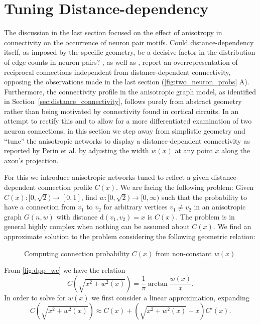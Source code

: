 \newpage
\section{Tuning Distance-dependency}\label{sec:tuned_networks}

The discussion in the last section focused on the effect of anisotropy
in connectivity on the occurrence of neuron pair motifs. Could
distance-dependency itself, as imposed by the specific geometry, be a
decisive factor in the distribution of edge counts in neuron pairs?
\textcite{Song2005}, as well as \textcite{Perin2011}, report an
overrepresentation of reciprocal connections independent from
distance-dependent connectivity, opposing the observations made in the
last section (\autoref{fig:two_neuron_probs} A). Furthermore, the
connectivity profile in the anisotropic graph model, as identified in
Section~\ref{sec:distance_connectivity}, follows purely from abstract
geometry rather than being motivated by connectivity found in cortical
circuits. In an attempt to rectify this and to allow for a more
differentiated examination of two neuron connections, in this section
we step away from simplistic geometry and \enquote{tune} the
anisotropic networks to display a distance-dependent connectivity as
reported by Perin et al. by adjusting the width $w(x)$ at any point
$x$ along the axon's projection.

For this we introduce anisotropic networks tuned to reflect a given
distance-dependent connection profile $C(x)$. We are facing the
following problem: Given $C(x):[0,\sqrt{2}) \to [0,1]$, find
$w:[0,\sqrt{2}) \to [0,\infty)$ such that the probability to have a
connection from $v_1$ to $v_2$ for arbitrary vertices $v_1 \neq v_2$
in an anisotropic graph $G(n,w)$ with distance $\mathrm{d}(v_1,v_2) =
x$ is $C(x)$. The problem is in general highly complex when nothing
can be assumed about $C(x)$. We find an approximate solution to the
problem considering the following geometric relation:

\begin{figure}[htp]
  \centering
  \caption{Computing connection probability $C(x)$ from non-constant
    $w(x)$}
  \label{fig:dpp_wc}
\end{figure}

From \autoref{fig:dpp_wc} we have the relation  
\begin{equation}
C\left(\sqrt{x^2+w^2(x)}\right) = \frac{1}{\pi} \operatorname{arctan}
\frac{w(x)}{x}. \label{eq:geo_rel}
\end{equation} 
In order to solve for $w(x)$ we first consider a linear approximation,
expanding
\[C\left(\sqrt{x^2+w^2(x)}\right) \approx C(x) + \left(\sqrt{x^2+w^2(x)} -
x\right) C'(x).\]

